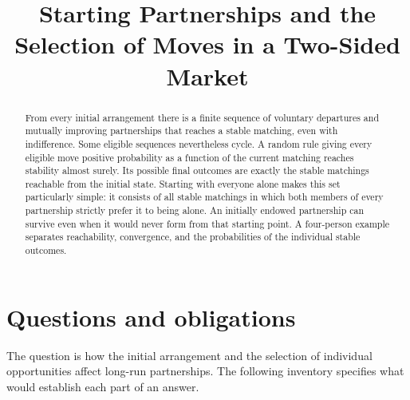 \documentclass[11pt]{article}
\title{Starting Partnerships and the Selection of Moves in a Two-Sided Market}
\author{}
\date{}
\begin{document}
\maketitle

\begin{abstract}
From every initial arrangement there is a finite sequence of voluntary departures and mutually improving partnerships that reaches a stable matching, even with indifference. Some eligible sequences nevertheless cycle. A random rule giving every eligible move positive probability as a function of the current matching reaches stability almost surely. Its possible final outcomes are exactly the stable matchings reachable from the initial state. Starting with everyone alone makes this set particularly simple: it consists of all stable matchings in which both members of every partnership strictly prefer it to being alone. An initially endowed partnership can survive even when it would never form from that starting point. A four-person example separates reachability, convergence, and the probabilities of the individual stable outcomes.
\end{abstract}

\section{Questions and obligations}

The question is how the initial arrangement and the selection of individual opportunities affect long-run partnerships. The following inventory specifies what would establish each part of an answer.
\end{document}
